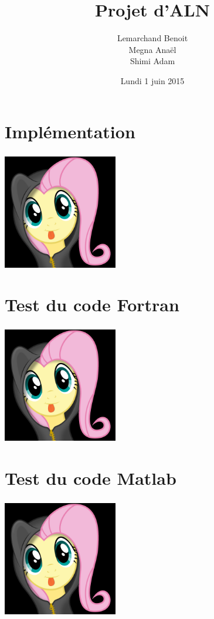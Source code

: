 \documentclass[slidetop,11pt]{beamer}
\title{Projet d'ALN}
\author{Lemarchand Benoit \\ Megna Anaël \\ Shimi Adam}
\institute{ENSEEIHT}
\date{Lundi 1 juin 2015}
\begin{document}
\frame{\titlepage}


\section{Implémentation}
\begin{frame}
  \frametitle{}
  \begin{center}
    \includegraphics[width=5cm]{fig/fluttershy.jpg}
  \end{center}
\end{frame}


\section{Test du code Fortran}
\begin{frame}
  \frametitle{}
  \begin{center}
    \includegraphics[width=5cm]{fig/fluttershy.jpg}
  \end{center}
\end{frame}


\section{Test du code Matlab}
\begin{frame}
  \frametitle{}
  \begin{center}
    \includegraphics[width=5cm]{fig/fluttershy.jpg}
  \end{center}
\end{frame}
\end{document}
